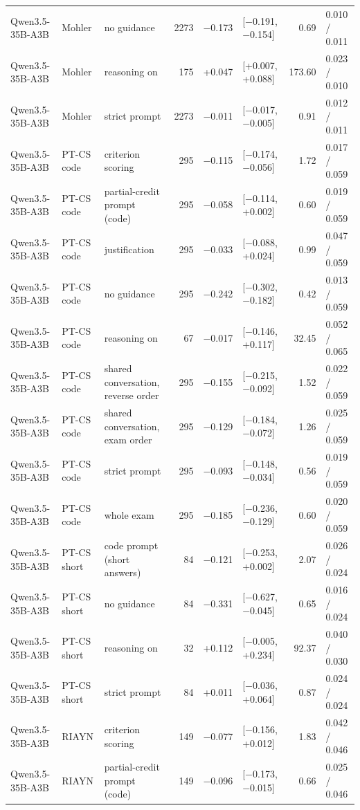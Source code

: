 \documentclass[10pt]{article}
\begin{document}
\begin{longtable}{ll>{\raggedright\arraybackslash}p{3.1cm}rrlrl}
Qwen3.5-35B-A3B & Mohler & no guidance & 2273 & $-$0.173 & [$-$0.191, $-$0.154] & 0.69 & 0.010 / 0.011 \\
Qwen3.5-35B-A3B & Mohler & reasoning on & 175 & +0.047 & [+0.007, +0.088] & 173.60 & 0.023 / 0.010 \\
Qwen3.5-35B-A3B & Mohler & strict prompt & 2273 & $-$0.011 & [$-$0.017, $-$0.005] & 0.91 & 0.012 / 0.011 \\
Qwen3.5-35B-A3B & PT-CS code & criterion scoring & 295 & $-$0.115 & [$-$0.174, $-$0.056] & 1.72 & 0.017 / 0.059 \\
Qwen3.5-35B-A3B & PT-CS code & partial-credit prompt (code) & 295 & $-$0.058 & [$-$0.114, +0.002] & 0.60 & 0.019 / 0.059 \\
Qwen3.5-35B-A3B & PT-CS code & justification & 295 & $-$0.033 & [$-$0.088, +0.024] & 0.99 & 0.047 / 0.059 \\
Qwen3.5-35B-A3B & PT-CS code & no guidance & 295 & $-$0.242 & [$-$0.302, $-$0.182] & 0.42 & 0.013 / 0.059 \\
Qwen3.5-35B-A3B & PT-CS code & reasoning on & 67 & $-$0.017 & [$-$0.146, +0.117] & 32.45 & 0.052 / 0.065 \\
Qwen3.5-35B-A3B & PT-CS code & shared conversation, reverse order & 295 & $-$0.155 & [$-$0.215, $-$0.092] & 1.52 & 0.022 / 0.059 \\
Qwen3.5-35B-A3B & PT-CS code & shared conversation, exam order & 295 & $-$0.129 & [$-$0.184, $-$0.072] & 1.26 & 0.025 / 0.059 \\
Qwen3.5-35B-A3B & PT-CS code & strict prompt & 295 & $-$0.093 & [$-$0.148, $-$0.034] & 0.56 & 0.019 / 0.059 \\
Qwen3.5-35B-A3B & PT-CS code & whole exam & 295 & $-$0.185 & [$-$0.236, $-$0.129] & 0.60 & 0.020 / 0.059 \\
Qwen3.5-35B-A3B & PT-CS short & code prompt (short answers) & 84 & $-$0.121 & [$-$0.253, +0.002] & 2.07 & 0.026 / 0.024 \\
Qwen3.5-35B-A3B & PT-CS short & no guidance & 84 & $-$0.331 & [$-$0.627, $-$0.045] & 0.65 & 0.016 / 0.024 \\
Qwen3.5-35B-A3B & PT-CS short & reasoning on & 32 & +0.112 & [$-$0.005, +0.234] & 92.37 & 0.040 / 0.030 \\
Qwen3.5-35B-A3B & PT-CS short & strict prompt & 84 & +0.011 & [$-$0.036, +0.064] & 0.87 & 0.024 / 0.024 \\
Qwen3.5-35B-A3B & RIAYN & criterion scoring & 149 & $-$0.077 & [$-$0.156, +0.012] & 1.83 & 0.042 / 0.046 \\
Qwen3.5-35B-A3B & RIAYN & partial-credit prompt (code) & 149 & $-$0.096 & [$-$0.173, $-$0.015] & 0.66 & 0.025 / 0.046 \\

\end{longtable}
\end{document}
